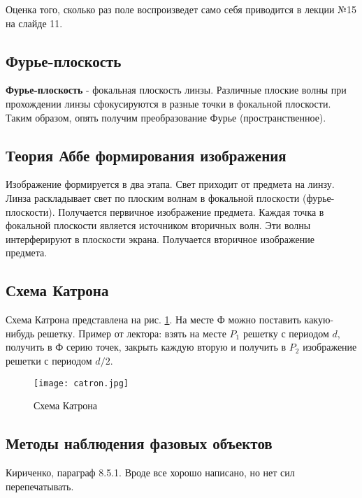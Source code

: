 Оценка того, сколько раз поле воспроизведет само себя приводится в лекции №15 на слайде 11.


\subsection{Фурье-плоскость}
\textbf{Фурье-плоскость} - фокальная плоскость линзы. Различные плоские волны при прохождении линзы сфокусируются в разные точки в фокальной плоскости. Таким образом, опять получим преобразование Фурье (пространственное).

\subsection{Теория Аббе формирования изображения}
Изображение формируется в два этапа. Свет приходит от предмета на линзу. Линза раскладывает свет по плоским волнам в фокальной плоскости (фурье-плоскости). Получается первичное изображение предмета. Каждая точка в фокальной плоскости является источником вторичных волн. Эти волны интерферируют в плоскости экрана. Получается вторичное изображение предмета.

\subsection{Схема Катрона}
Схема Катрона представлена на рис. \ref{catron}. На месте Ф можно поставить какую-нибудь решетку. Пример от лектора: взять на месте \(P_1\) решетку с периодом \(d\), получить в Ф серию точек, закрыть каждую вторую и получить в \(P_2\) изображение решетки с периодом \(d / 2\).
\begin{figure}[H]
    \centering
    \texttt{[image: catron.jpg]}
    \caption{Схема Катрона}
    \label{catron}
\end{figure}

\subsection{Методы наблюдения фазовых объектов}
Кириченко, параграф 8.5.1. Вроде все хорошо написано, но нет сил перепечатывать.
